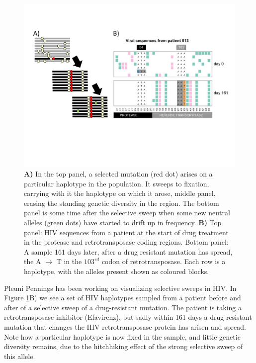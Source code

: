 \begin{figure}
\begin{center}
\includegraphics[width= \textwidth]{Journal_figs/recom_selection/Pleuni_HIV_sweep/HIV_no_recom_sweep.pdf}
\end{center}
\caption{{\bf A)} In the top panel, a selected mutation (red dot) arises
on a particular haplotype in the population. It sweeps to fixation,
carrying with it the haplotype on which it arose, middle panel,
erasing the standing genetic diversity in the region. The bottom panel
is some time after the selective sweep when some new neutral alleles (green
dots) have started to drift up in frequency. {\bf B)}  Top panel: HIV
sequences from a patient at the start of drug treatment in the
protease and retrotransposase coding regions. Bottom panel: A sample
161 days later, after a drug resistant mutation has spread, the A
$\rightarrow$ T in the $103^{rd}$ codon of retrotransposase. Each row is a haplotype,
with the alleles present shown as coloured blocks. } \label{fig:HIV_sweep}
\end{figure}

Pleuni Pennings has been working on visualizing selective sweeps in
HIV. In Figure \ref{fig:HIV_sweep}B) we see a set of HIV haplotypes
sampled from a patient before and after of a selective sweep of a
drug-resistant mutation. The patient is taking a
retrotransposase inhibitor (Efavirenz), but sadly within 161 days a
drug-resistant mutation that changes the HIV retrotransposase protein has arisen and spread. Note how a particular haplotype is now fixed in
the sample, and little genetic diversity remains, due to the
hitchhiking effect of the strong
selective sweep of this allele. 


